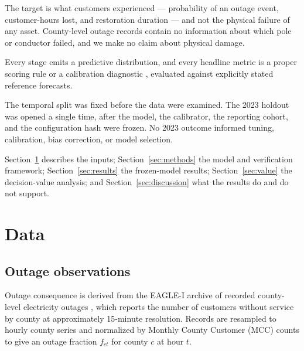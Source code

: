 \documentclass[10pt,twocolumn,letterpaper]{article}
\newcommand{\CH}{customer-hours}
\begin{document}
\begin{description}[leftmargin=1.1em,itemsep=0.25em,topsep=0.3em]
\item[\textnormal{\emph{Consequence, not fragility.}}] The target is what
customers experienced --- probability of an outage event, \CH{} lost, and
restoration duration --- and not the physical failure of any asset. County-level
outage records contain no information about which pole or conductor failed, and
we make no claim about physical damage.

\item[\textnormal{\emph{Distributions, not point forecasts.}}] Every stage emits
a predictive distribution, and every headline metric is a proper scoring rule
\citep{gneiting2007scoringrules} or a calibration diagnostic
\citep{gneiting2007calibration}, evaluated against explicitly stated reference
forecasts.

\item[\textnormal{\emph{One test, scored once.}}] The temporal split was fixed
before the data were examined. The 2023 holdout was opened a single time, after
the model, the calibrator, the reporting cohort, and the configuration hash were
frozen. No 2023 outcome informed tuning, calibration, bias correction, or model
selection.
\end{description}

Section~\ref{sec:data} describes the inputs; Section~\ref{sec:methods} the model
and verification framework; Section~\ref{sec:results} the frozen-model results;
Section~\ref{sec:value} the decision-value analysis; and
Section~\ref{sec:discussion} what the results do and do not support.

\section{Data}\label{sec:data}

\subsection{Outage observations}

Outage consequence is derived from the EAGLE-I archive of recorded county-level
electricity outages \citep{brelsford2024eaglei}, which reports the number of
customers without service by county at approximately 15-minute resolution.
Records are resampled to hourly county series and normalized by Monthly County
Customer (MCC) counts to give an outage fraction $f_{ct}$ for county $c$ at hour
$t$.
\end{document}
